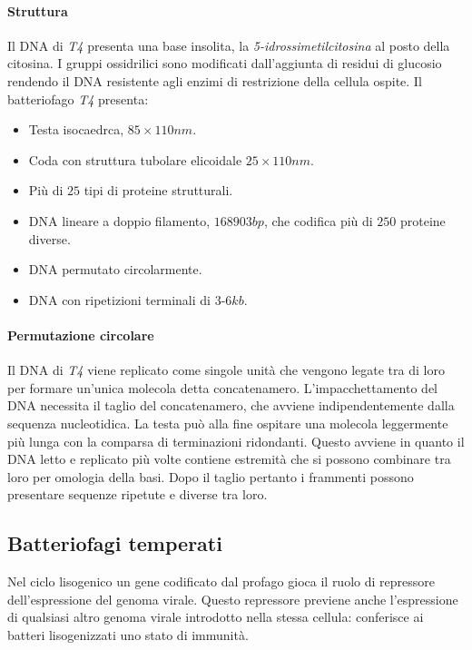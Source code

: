 			\paragraph{Struttura}
			Il DNA di \emph{T4} presenta una base insolita, la \emph{5-idrossimetilcitosina} al posto della citosina. 
			I gruppi ossidrilici sono modificati dall'aggiunta di residui di glucosio rendendo il DNA resistente agli enzimi di restrizione della cellula ospite. 
			Il batteriofago \emph{T4} presenta:
			\begin{multicols}{2}
				\begin{itemize}
    					\item Testa isocaedrca, $85\times 110\si{nm}$. 
    					\item Coda con struttura tubolare elicoidale $25\times 110\si{nm}$.
    					\item Più di $25$ tipi di proteine strutturali.
    					\item DNA lineare a doppio filamento, $168903 bp$, che codifica più di $250$ proteine diverse.
    					\item DNA permutato circolarmente.
    					\item DNA con ripetizioni terminali di $3$-$6 kb$.
				\end{itemize}
			\end{multicols}

			\paragraph{Permutazione circolare}
			Il DNA di \emph{T4} viene replicato come singole unità che vengono legate tra di loro per formare un'unica molecola detta concatenamero.
			L'impacchettamento del DNA necessita il taglio del concatenamero, che avviene indipendentemente dalla sequenza nucleotidica.
			La testa pu\`o alla fine ospitare una molecola leggermente pi\`u lunga con la comparsa di terminazioni ridondanti.
			Questo avviene in quanto il DNA letto e replicato pi\`u volte contiene estremit\`a che si possono combinare tra loro per omologia della basi.
			Dopo il taglio pertanto i frammenti possono presentare sequenze ripetute e diverse tra loro.

	\subsection{Batteriofagi temperati}
	Nel ciclo lisogenico un gene codificato dal profago gioca il ruolo di repressore dell'espressione del genoma virale. 
	Questo repressore previene anche l'espressione di qualsiasi altro genoma virale introdotto nella stessa cellula: conferisce ai batteri lisogenizzati uno stato di immunità.

